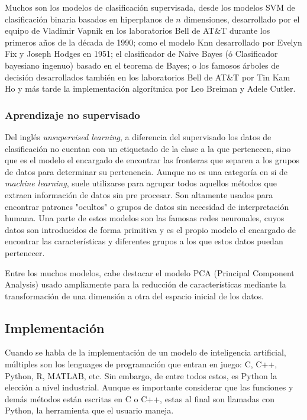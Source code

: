 Muchos son los modelos de clasificación supervisada, desde los modelos SVM de clasificación binaria basados en hiperplanos de $n$ dimensiones, desarrollado por el equipo de Vladimir Vapnik en los laboratorios Bell de AT\&T durante los primeros años de la década de 1990; como el modelo Knn desarrollado por Evelyn Fix y Joseph Hodges en 1951; el clasificador de Naive Bayes (ó Clasificador bayesiano ingenuo) basado en el teorema de Bayes; o los famosos árboles de decisión desarrollados también en los laboratorios Bell de AT\&T por Tin Kam Ho y más tarde la implementación algorítmica por Leo Breiman y Adele Cutler.

\subsubsection{Aprendizaje no supervisado}

Del inglés \textit{unsupervised learning}, a diferencia del supervisado los datos de clasificación no cuentan con un etiquetado de la clase a la que pertenecen, sino que es el modelo el encargado de encontrar las fronteras que separen a los grupos de datos para determinar su pertenencia. Aunque no es una categoría en si de \textit{machine learning}, suele utilizarse para agrupar todos aquellos métodos que extraen información de datos sin pre procesar. Son altamente usados para encontrar patrones "ocultos" o grupos de datos sin necesidad de interpretación humana. Una parte de estos modelos son las famosas redes neuronales, cuyos datos son introducidos de forma primitiva y es el propio modelo el encargado de encontrar las características y diferentes grupos a los que estos datos puedan pertenecer.

Entre los muchos modelos, cabe destacar el modelo PCA (Principal Component Analysis) usado ampliamente para la reducción de características mediante la transformación de una dimensión a otra del espacio inicial de los datos.

\subsection{Implementación}

Cuando se habla de la implementación de un modelo de inteligencia artificial, múltiples son los lenguages de programación que entran en juego: C, C++, Python, R, MATLAB, etc. Sin embargo, de entre todos estos, es Python la elección a nivel industrial. Aunque es importante considerar que las funciones y demás métodos están escritas en C o C++, estas al final son llamadas con Python, la herramienta que el usuario maneja.

